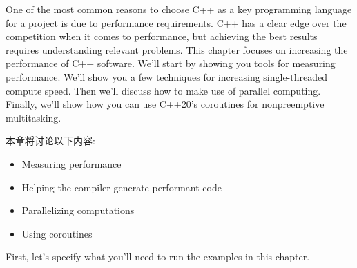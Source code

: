 
One of the most common reasons to choose C++ as a key programming language for a project is due to performance requirements. C++ has a clear edge over the competition when it comes to performance, but achieving the best results requires understanding relevant problems. This chapter focuses on increasing the performance of C++ software. We'll start by showing you tools for measuring performance. We'll show you a few techniques for increasing single-threaded compute speed. Then we'll discuss how to make use of parallel computing. Finally, we'll show how you can use C++20's coroutines for nonpreemptive multitasking.

本章将讨论以下内容:

\begin{itemize}
\item 
Measuring performance

\item 
Helping the compiler generate performant code

\item 
Parallelizing computations

\item 
Using coroutines
\end{itemize}

First, let's specify what you'll need to run the examples in this chapter.


